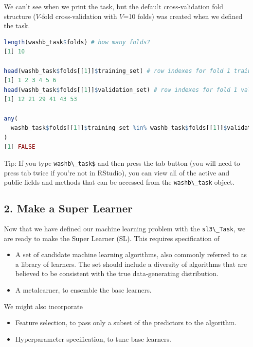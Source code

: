 \documentclass[
  12pt, krantz2,
]{krantz}
\newcommand{\passthrough}[1]{#1}
\providecommand{\tightlist}{%
  \setlength{\itemsep}{0pt}\setlength{\parskip}{0pt}}
\newcommand{\1}{\mathbbm{1}}
\theoremstyle{definition}
\theoremstyle{definition}
\theoremstyle{definition}
\theoremstyle{definition}
\theoremstyle{remark}
\begin{document}
We can't see when we print the task, but the default cross-validation fold
structure (\(V\)-fold cross-validation with \(V\)=10 folds) was created when we
defined the task.

\begin{lstlisting}[language=R]
length(washb_task$folds) # how many folds?
[1] 10

head(washb_task$folds[[1]]$training_set) # row indexes for fold 1 training
[1] 1 2 3 4 5 6
head(washb_task$folds[[1]]$validation_set) # row indexes for fold 1 validation
[1] 12 21 29 41 43 53

any(
  washb_task$folds[[1]]$training_set %in% washb_task$folds[[1]]$validation_set
)
[1] FALSE
\end{lstlisting}

Tip: If you type \passthrough{\lstinline!washb\_task$!} and then press the tab button (you will
need to press tab twice if you're not in RStudio), you can view all of the
active and public fields and methods that can be accessed from the \passthrough{\lstinline!washb\_task!}
object.

\hypertarget{make-a-super-learner}{%
\subsection*{2. Make a Super Learner}\label{make-a-super-learner}}


Now that we have defined our machine learning problem with the \passthrough{\lstinline!sl3\_Task!}, we
are ready to make the Super Learner (SL). This requires specification of

\begin{itemize}
\tightlist
\item
  A set of candidate machine learning algorithms, also commonly referred to as
  a library of learners. The set should include a diversity of algorithms
  that are believed to be consistent with the true data-generating distribution.
\item
  A metalearner, to ensemble the base learners.
\end{itemize}

We might also incorporate

\begin{itemize}
\tightlist
\item
  Feature selection, to pass only a subset of the predictors to the algorithm.
\item
  Hyperparameter specification, to tune base learners.
\end{itemize}
\end{document}
